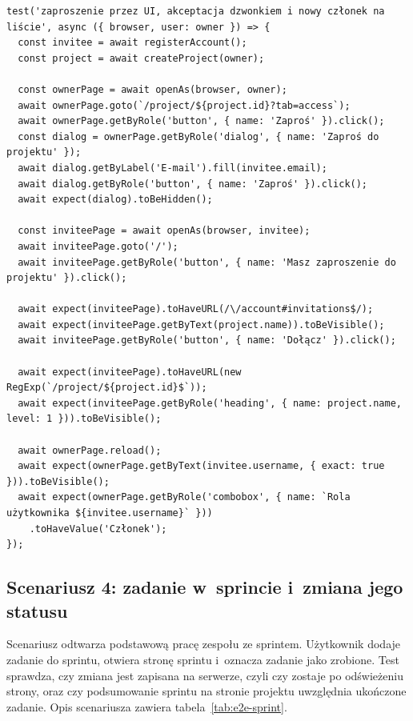 \begin{lstlisting}[basicstyle=\footnotesize\ttfamily, captionpos=t, caption={Test zaproszenia z udziałem dwóch użytkowników}, label={lst:e2e-zaproszenie}]
test('zaproszenie przez UI, akceptacja dzwonkiem i nowy członek na liście', async ({ browser, user: owner }) => {
  const invitee = await registerAccount();
  const project = await createProject(owner);

  const ownerPage = await openAs(browser, owner);
  await ownerPage.goto(`/project/${project.id}?tab=access`);
  await ownerPage.getByRole('button', { name: 'Zaproś' }).click();
  const dialog = ownerPage.getByRole('dialog', { name: 'Zaproś do projektu' });
  await dialog.getByLabel('E-mail').fill(invitee.email);
  await dialog.getByRole('button', { name: 'Zaproś' }).click();
  await expect(dialog).toBeHidden();

  const inviteePage = await openAs(browser, invitee);
  await inviteePage.goto('/');
  await inviteePage.getByRole('button', { name: 'Masz zaproszenie do projektu' }).click();

  await expect(inviteePage).toHaveURL(/\/account#invitations$/);
  await expect(inviteePage.getByText(project.name)).toBeVisible();
  await inviteePage.getByRole('button', { name: 'Dołącz' }).click();

  await expect(inviteePage).toHaveURL(new RegExp(`/project/${project.id}$`));
  await expect(inviteePage.getByRole('heading', { name: project.name, level: 1 })).toBeVisible();

  await ownerPage.reload();
  await expect(ownerPage.getByText(invitee.username, { exact: true })).toBeVisible();
  await expect(ownerPage.getByRole('combobox', { name: `Rola użytkownika ${invitee.username}` }))
    .toHaveValue('Członek');
});
\end{lstlisting}

\subsection{Scenariusz 4: zadanie w~sprincie i~zmiana jego statusu}
Scenariusz odtwarza podstawową pracę zespołu ze sprintem. Użytkownik dodaje zadanie do sprintu, otwiera stronę sprintu
i~oznacza zadanie jako zrobione. Test sprawdza, czy zmiana jest zapisana na serwerze, czyli czy zostaje po odświeżeniu
strony, oraz czy podsumowanie sprintu na stronie projektu uwzględnia ukończone zadanie. Opis scenariusza zawiera tabela~\ref{tab:e2e-sprint}.

